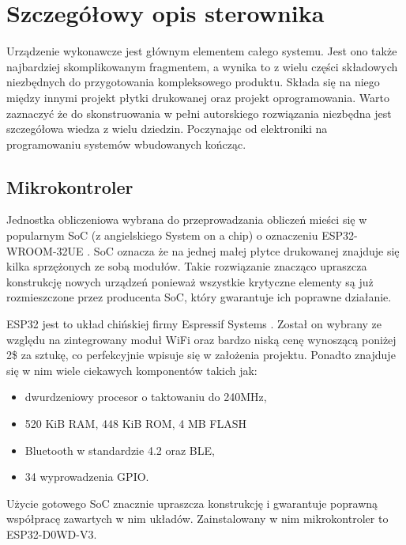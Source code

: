     \chapter{Szczegółowy opis sterownika}
        Urządzenie wykonawcze jest głównym elementem całego systemu. Jest ono także najbardziej skomplikowanym fragmentem, a wynika to z wielu części składowych niezbędnych do przygotowania kompleksowego produktu. Składa się na niego między innymi projekt płytki drukowanej oraz projekt oprogramowania. Warto zaznaczyć że do skonstruowania w pełni autorskiego rozwiązania niezbędna jest szczegółowa wiedza z wielu dziedzin. Poczynając od elektroniki na programowaniu systemów wbudowanych kończąc.
    
    
        \section{Mikrokontroler}
            Jednostka obliczeniowa wybrana do przeprowadzania obliczeń mieści się w popularnym SoC (z angielskiego System on a chip) o oznaczeniu ESP32-WROOM-32UE \cite{esp_module}. SoC oznacza że na jednej małej płytce drukowanej znajduje się kilka sprzężonych ze sobą modułów. Takie rozwiązanie znacząco upraszcza konstrukcję nowych urządzeń ponieważ wszystkie krytyczne elementy są już rozmieszczone przez producenta SoC, który gwarantuje ich poprawne działanie.
            
            ESP32 jest to układ chińskiej firmy Espressif Systems \cite{espressif}. Został on wybrany ze względu na zintegrowany moduł WiFi oraz bardzo niską cenę wynoszącą poniżej 2\$ za sztukę, co perfekcyjnie wpisuje się w założenia projektu. Ponadto znajduje się w nim wiele ciekawych komponentów takich jak:
    
            \begin{itemize}
              \item dwurdzeniowy procesor o taktowaniu do 240MHz,
              \item 520 KiB RAM, 448 KiB ROM, 4 MB FLASH
              \item Bluetooth w standardzie 4.2 oraz BLE,
              \item 34 wyprowadzenia GPIO.
            \end{itemize}
            
            Użycie gotowego SoC znacznie upraszcza konstrukcję i gwarantuje poprawną współpracę zawartych w nim układów. Zainstalowany w nim mikrokontroler to ESP32-D0WD-V3. 
    
